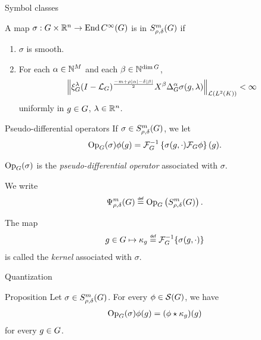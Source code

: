 \documentclass[handout]{beamer}
\begin{document}
\begin{frame}{Symbol classes}
    \begin{definition}
        A map $\sigma: G \times \mathbb{R}^n \to \operatorname{End} {{C^\infty(G)}}$ is in $S^{m}_{\rho, \delta}(G)$ if
        \begin{enumerate}
            \item
                $\sigma$ is smooth.
            \item
                For each $\alpha \in \mathbb{N}^M$ and each $\beta \in \mathbb{N}^{\dim G}$,
                \begin{align*}
                    \norm [\Lin {\Lebesgue 2 \CompactGroup}] {
                        \Rep \lambda \BesselPotential {-m + \rho \abs \alpha - \delta \abs \beta}
                        \LeftDifferentialOperator \beta \DifferenceOperatorOrder \alpha \sigma(g, \lambda)
                    } < \infty
                \end{align*}
                uniformly in $g \in G$, $\lambda \in \mathbb{R}^n$.
        \end{enumerate}
    \end{definition}
\end{frame}

\begin{frame}{Pseudo-differential operators}
    If $\sigma \in S^{m}_{\rho, \delta}(G)$,
    we let
    \begin{align*}
        \mathrm{Op}_{G}(\sigma) \phi(g) = \mathcal{F}^{-1}_{G} \left\{ \sigma(g, \cdot) \mathcal{F}_{G} \phi \right\}(g).
    \end{align*}

    $\mathrm{Op}_{G}(\sigma)$ is the \emph{pseudo-differential operator} associated with $\sigma$.

    We write
    \begin{align*}
        \OperatorClass m {\rho, \delta} \defeq \Op \left(\SymbolClass m {\rho, \delta}\right).
    \end{align*}

    \pause

    The map
    \begin{align*}
        g \in \Group \mapsto \kappa_g \defeq \InverseFourier \{\sigma(g, \dummy)\}
    \end{align*}
    is called the \emph{kernel} associated with $\sigma$.
\end{frame}

\begin{frame}{Quantization}
    \begin{block}{Proposition}
        Let $\sigma \in S^{m}_{\rho, \delta}(G)$.
        For every $\phi \in {\mathcal{S} (G)}$,
        we have
        \begin{align*}
            \mathrm{Op}_{G}(\sigma) \phi(g) = (\phi \star \kappa_g)(g)
        \end{align*}
        for every $g \in G$.
    \end{block}
\end{frame}
\end{document}
